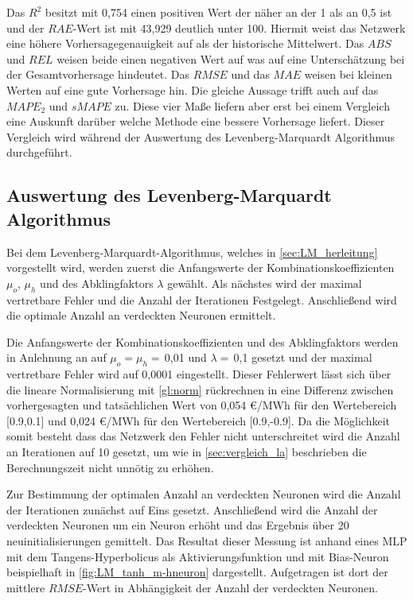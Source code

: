 Das $R^2$ besitzt mit 0,754 einen positiven Wert der näher an der 1 als an 0,5 ist und der $RAE$-Wert ist mit 43,929 deutlich unter 100. Hiermit weist das Netzwerk eine höhere Vorhersagegenauigkeit auf als der historische Mittelwert. Das $ABS$ und $REL$ weisen beide einen negativen Wert auf was auf eine Unterschätzung bei der Gesamtvorhersage hindeutet. Das $RMSE$ und das $MAE$ weisen bei kleinen Werten auf eine gute Vorhersage hin. Die gleiche Aussage trifft auch auf das $MAPE_2$ und $sMAPE$ zu. Diese vier Maße liefern aber erst bei einem Vergleich eine Auskunft darüber welche Methode eine bessere Vorhersage liefert. Dieser Vergleich wird während der Auswertung des Levenberg-Marquardt Algorithmus durchgeführt.

\newpage

\subsection{Auswertung des Levenberg-Marquardt Algorithmus}\label{sec:aus_LM}

Bei dem Levenberg-Marquardt-Algorithmus, welches in \autoref{sec:LM_herleitung} vorgestellt wird, werden zuerst die Anfangswerte der Kombinationskoeffizienten $\mu_o$, $\mu_h$ und des Abklingfaktors $\lambda$ gewählt. Als nächstes wird der maximal vertretbare Fehler und die Anzahl der Iterationen Festgelegt. Anschließend wird die optimale Anzahl an verdeckten Neuronen ermittelt.

Die Anfangswerte der Kombinationskoeffizienten und des Abklingfaktors werden in Anlehnung an \citet{Kwak2012} auf $\mu_o=\mu_h=$\,0,01 und $\lambda=$\,0,1 gesetzt und der maximal vertretbare Fehler wird auf 0,0001 eingestellt. Dieser Fehlerwert lässt sich über die lineare Normalisierung mit \autoref{gl:norm} rückrechnen in eine Differenz zwischen vorhergesagten und tatsächlichen Wert von 0,054 €/MWh für den Wertebereich [0.9,0.1] und 0,024 €/MWh für den Wertebereich [0.9,-0.9].  Da die Möglichkeit somit besteht dass das Netzwerk den Fehler nicht unterschreitet wird die Anzahl an Iterationen auf 10 gesetzt, um wie in \autoref{sec:vergleich_la} beschrieben die Berechnungszeit nicht unnötig zu erhöhen. 

Zur Bestimmung der optimalen Anzahl an verdeckten Neuronen wird die Anzahl der Iterationen zunächst auf Eins gesetzt. Anschließend wird die Anzahl der verdeckten Neuronen um ein Neuron erhöht und das Ergebnis über 20 neuinitialisierungen gemittelt. Das Resultat dieser Messung ist anhand eines MLP mit dem Tangens-Hyperbolicus als Aktivierungsfunktion und mit Bias-Neuron beispielhaft in \autoref{fig:LM_tanh_m-hneuron} dargestellt. Aufgetragen ist dort der mittlere $RMSE$-Wert in Abhängigkeit der Anzahl der verdeckten Neuronen.

